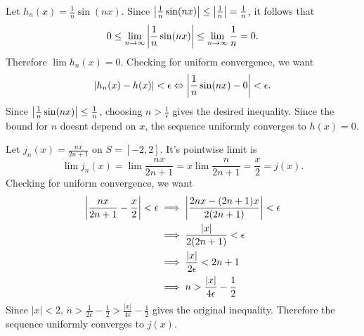 \documentclass[../notes.tex]{subfiles}
\begin{document}
\begin{example}
    Let $h_n(x) = \frac{1}{n} \sin(nx)$. Since $\qty|\frac{1}{n} \sin(nx)| \leq \qty|\frac{1}{n}| = \frac{1}{n}$, it follows that
    \[
        0 \leq \lim_{n\to \infty} \qty|\frac{1}{n} \sin(nx)| \leq \lim_{n \to \infty} \frac{1}{n} = 0
    .\]
    Therefore $\lim h_n(x) = 0$. Checking for uniform convergence, we want
    \[
        |h_n(x) - h(x)| < \epsilon \Leftrightarrow \qty|\frac{1}{n} \sin(nx) - 0| < \epsilon
    .\]
    Since $\qty|\frac{1}{n} \sin(nx)| \leq \frac{1}{n}$, choosing $n > \frac{1}{\epsilon}$ gives the desired inequality. Since the bound for $n$ doesnt depend on $x$, the sequence uniformly converges to $h(x) = 0$.
\end{example}

\begin{example}
    Let $j_n(x) = \frac{nx}{2n + 1}$ on $S = [-2, 2]$. It's pointwise limit is
    \[
        \lim j_n(x) = \lim \frac{nx}{2n + 1} = x \lim \frac{n}{2n+1} = \frac{x}{2} = j(x)
    .\]
    Checking for uniform convergence, we want
    \begin{align*}
        \qty|\frac{nx}{2n+1} - \frac{x}{2}| < \epsilon &\implies \qty|\frac{2nx - (2n+1)x}{2(2n+1)}| < \epsilon \\
                                               &\implies \frac{|x|}{2(2n+1)} < \epsilon\\
                                               &\implies \frac{|x|}{2\epsilon} < 2n + 1\\
                                               &\implies n > \frac{|x|}{4\epsilon} - \frac{1}{2}
    \end{align*}
    Since $|x| < 2$, $n > \frac{1}{2\epsilon} - \frac{1}{2} > \frac{|x|}{4\epsilon} - \frac{1}{2}$ gives the original inequality. Therefore the sequence uniformly converges to $j(x)$.
\end{example}
\end{document}
